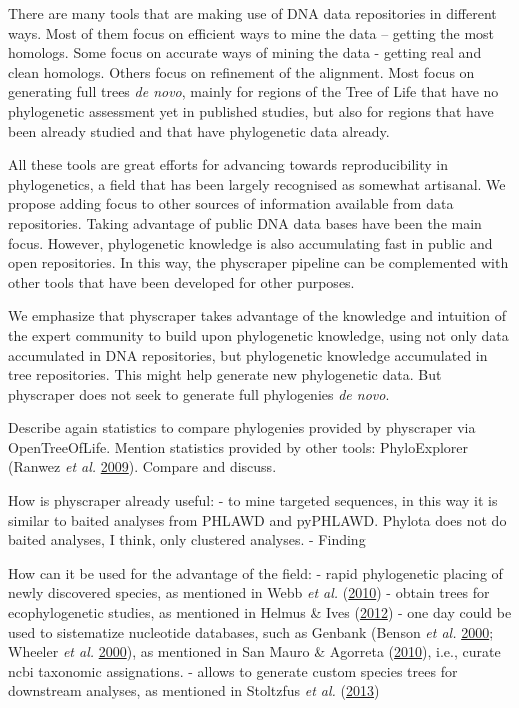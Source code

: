 \documentclass[]{article}
\begin{document}
There are many tools that are making use of DNA data repositories in different ways.
Most of them focus on efficient ways to mine the data -- getting the most homologs.
Some focus on accurate ways of mining the data - getting real and clean homologs.
Others focus on refinement of the alignment.
Most focus on generating full trees \emph{de novo}, mainly for regions of the Tree of
Life that have no phylogenetic assessment yet in published studies, but also for
regions that have been already studied and that have phylogenetic data already.

All these tools are great efforts for advancing towards reproducibility in phylogenetics,
a field that has been largely recognised as somewhat artisanal.
We propose adding focus to other sources of information available from data repositories.
Taking advantage of public DNA data bases have been the main focus. However, phylogenetic knowledge is
also accumulating fast in public and open repositories.
In this way, the physcraper pipeline can be complemented with other tools that have
been developed for other purposes.

We emphasize that physcraper takes advantage of the knowledge and intuition of the expert
community to build upon phylogenetic knowledge, using not only data accumulated in
DNA repositories, but phylogenetic knowledge accumulated in tree repositories.
This might help generate new phylogenetic data. But physcraper does not seek to generate full phylogenies \emph{de novo}.

Describe again statistics to compare phylogenies provided by physcraper via OpenTreeOfLife.
Mention statistics provided by other tools: PhyloExplorer (Ranwez \emph{et al.} \protect\hyperlink{ref-ranwez2009phyloexplorer}{2009}).
Compare and discuss.

How is physcraper already useful:
- to mine targeted sequences, in this way it is similar to baited analyses from PHLAWD and pyPHLAWD. Phylota does not do baited analyses, I think, only clustered analyses.
- Finding

How can it be used for the advantage of the field:
- rapid phylogenetic placing of newly discovered species, as mentioned in Webb \emph{et al.} (\protect\hyperlink{ref-webb2010biodiversity}{2010})
- obtain trees for ecophylogenetic studies, as mentioned in Helmus \& Ives (\protect\hyperlink{ref-helmus2012phylogenetic}{2012})
- one day could be used to sistematize nucleotide databases, such as Genbank (Benson \emph{et al.} \protect\hyperlink{ref-benson2000genbank}{2000}; Wheeler \emph{et al.} \protect\hyperlink{ref-wheeler2000database}{2000}), as mentioned in San Mauro \& Agorreta (\protect\hyperlink{ref-san2010molecular}{2010}), i.e., curate ncbi taxonomic assignations.
- allows to generate custom species trees for downstream analyses, as mentioned in Stoltzfus \emph{et al.} (\protect\hyperlink{ref-stoltzfus2013phylotastic}{2013})
\end{document}

